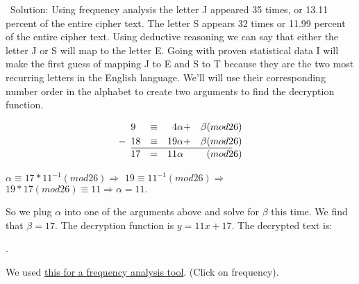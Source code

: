 \documentclass[12pt,letterpaper,final]{report}
\begin{document}
\indent\ Solution: Using frequency analysis the letter J appeared 35 times, or 13.11 percent of the entire cipher text. The letter S appears 32 times or 11.99 percent of the entire cipher text. Using deductive reasoning we can say that either the letter J or S will map to the letter E. Going with proven statistical data I will make the first guess of mapping J to E and S to T because they are the two most recurring letters in the English language. We'll will use their corresponding number order in the alphabet to create two arguments to find the decryption function. 



\begin{alignat*}{4}
    &9&\equiv&&4\alpha&+&\beta (mod26)\\   
    -\hspace*{.5em}&18&\equiv&&19\alpha&+&\beta (mod 26)\\[-2.5ex]\cline{2-8}\\[-4.8ex]
    &17&=&&11\alpha && (mod 26)
\end{alignat*}

$ \alpha \equiv 17 * 11^{-1} (mod 26) \Longrightarrow$
$ 19 \equiv 11^{-1} (mod 26) \Longrightarrow$
$19 * 17 (mod 26) \equiv 11 \Longrightarrow \alpha = 11.$
\bigskip

\noindent So we plug $\alpha$ into one of the arguments above and solve for $\beta$ this time. 
We find that $\beta = 17$. The decryption function is $y = 11x + 17$. The decrypted text is:

.

\bigskip

We used \href{http://www.dcode.fr/frequency-analysis}{this for a frequency analysis tool}. (Click on frequency).
\end{document}
